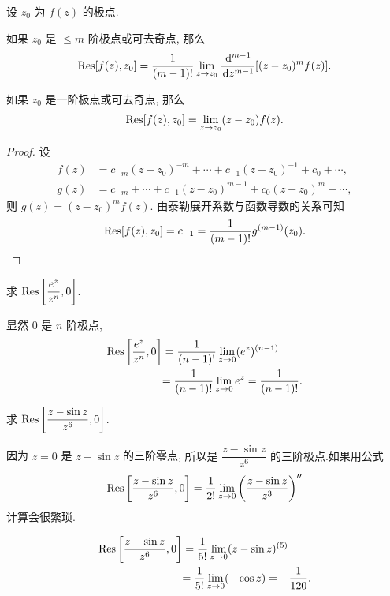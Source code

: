 \documentclass[nocolor,theme=doremi,lang=cn,11pt,chinese,twoside,openright,usesamecnt]{elegantbook}
\newenvironment{alertblock}[1]{\begin{tcolorbox}[alertstyle,title=#1]}{\end{tcolorbox}}
\begin{document}
设 $z_0$ 为 $f(z)$ 的极点.

\begin{alertblock}{极点留数计算公式 I}
	如果 $z_0$ 是 $\le m$ 阶极点或可去奇点, 那么
	\[{\mathrm{Res}}[f(z),z_0]=\frac1{(m-1)!}\lim_{z\to z_0}\frac{\,\mathrm{d}^{m-1}}{\,\mathrm{d} z^{m-1}}[(z-z_0)^mf(z)].\]
\end{alertblock}

\begin{alertblock}{极点留数计算公式 II}
	如果 $z_0$ 是一阶极点或可去奇点, 那么
	\[{\mathrm{Res}}[f(z),z_0]=\lim\limits_{z\to z_0}(z-z_0)f(z).\]
\end{alertblock}

\begin{proof}
	设
	\begin{align*}
		f(z)&=c_{-m}(z-z_0)^{-m}+\cdots+c_{-1}(z-z_0)^{-1}+c_0+\cdots,\\
		g(z)&=c_{-m}+\cdots+c_{-1}(z-z_0)^{m-1}+c_0(z-z_0)^m+\cdots,
	\end{align*}
{%
	则 $g(z)=(z-z_0)^mf(z)$.
}%
{%
	由泰勒展开系数与函数导数的关系可知
	\[{\mathrm{Res}}[f(z),z_0]=c_{-1}=\dfrac1{(m-1)!}g^{(m-1)}(z_0).\qedhere\]
}
\end{proof}

\begin{example}
	求 ${\mathrm{Res}}\left[\dfrac{e^z}{z^n},0\right]$.
\end{example}

\begin{solution}
		显然 $0$ 是 $n$ 阶极点,
	{\begin{align*}
			{\mathrm{Res}}\left[\frac{e^z}{z^n},0\right]&=\frac1{(n-1)!}\lim_{z\to0}(e^z)^{(n-1)}\\
			&{=\frac1{(n-1)!}\lim_{z\to0}e^z=\frac1{(n-1)!}.}
		\end{align*}
	}
\end{solution}

\begin{example}
	求 ${\mathrm{Res}}\left[\dfrac{z-\sin z}{z^6},0\right]$.
\end{example}

\begin{solution}
		因为 $z=0$ 是 $z-\sin z$ 的三阶零点,
	{所以是 $\dfrac{z-\sin z}{z^6}$ 的三阶极点.如果用公式
		\[{\mathrm{Res}}\left[\frac{z-\sin z}{z^6},0\right]
		=\frac1{2!}\lim_{z\to0}\left(\frac{z-\sin z}{z^3}\right)''\]
		计算会很繁琐.
	}

	{
	\begin{align*}
		{\mathrm{Res}}\left[\frac{z-\sin z}{z^6},0\right]&=\frac1{5!}\lim_{z\to0}(z-\sin z)^{(5)}\\
		&{=\frac1{5!}\lim_{z\to0}(-\cos z)=-\frac1{120}.}
	\end{align*}}
\end{solution}
\end{document}
